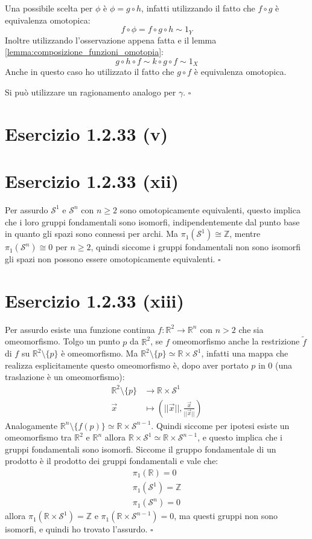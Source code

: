 \documentclass[10pt]{scrartcl}
\newcommand{\Z}{\mathbb{Z}}
\newcommand{\Sph}[1][]{\mathcal{S}^#1}
\begin{document}
Una possibile scelta per $ \phi $ è $ \phi = g \circ h $, infatti utilizzando
il fatto che $ f \circ g $ è equivalenza omotopica:
\[
  f \circ \phi = f \circ g \circ h \sim 1_Y
\]
Inoltre utilizzando l'osservazione appena fatta e il lemma
\ref{lemma:composizione_funzioni_omotopia}:
\[
  g \circ h \circ f \sim k \circ g \circ f \sim 1_X
\]
Anche in questo caso ho utilizzato il fatto che $ g \circ f $ è equivalenza
omotopica.

Si può utilizzare un ragionamento analogo per $ \gamma $.
\hfill $ \square $

\section*{Esercizio 1.2.33 (v)}


\section*{Esercizio 1.2.33 (xii)}
Per assurdo $ \Sph{1} $ e $ \Sph{n} $ con $ n \geq 2 $ sono omotopicamente
equivalenti, questo implica che i loro gruppi fondamentali sono isomorfi,
indipendentemente dal punto base in quanto gli spazi sono connessi per archi.
Ma $ \pi_1(\Sph{1}) \cong \Z $, mentre $ \pi_1(\Sph{n}) \cong 0 $ per $ n \geq 2 $, quindi
siccome i gruppi fondamentali non sono isomorfi gli spazi non possono
essere omotopicamente equivalenti.
\hfill $ \square $

\section*{Esercizio 1.2.33 (xiii)}
Per assurdo esiste una funzione continua $ f \colon \mathbb{R}^2 \to \mathbb{R}^n $
con $ n > 2 $ che sia omeomorfismo. Tolgo un punto $ p $ da $ \mathbb{R}^2 $,
se $ f $ omeomorfismo anche la restrizione $ \tilde{f} $ di $ f $ su
$ \mathbb{R}^2 \setminus \{ p \} $ è omeomorfismo.
Ma  $ \mathbb{R}^{2} \setminus  \{ p \} \simeq \mathbb{R} \times \mathcal{S}^1 $, infatti una mappa
che realizza esplicitamente questo omeomorfismo è, dopo aver portato $ p $ in $ 0 $
(una traslazione è un omeomorfismo):
\begin{align*}
  \mathbb{R}^{2} \setminus \{ p \} & \to \mathbb{R} \times \mathcal{S}^1 \\
  \vec{x} & \mapsto \left( || \vec{x} ||, \frac{\vec{x}}{|| \vec{x} ||} \right)
\end{align*}
Analogamente $ \mathbb{R}^{n} \setminus \{ f(p) \}  \simeq \mathbb{R} \times \Sph{n-1} $.
Quindi siccome per ipotesi esiste un omeomorfismo tra $ \mathbb{R}^{2} $ e
$ \mathbb{R}^{n} $ allora $ \mathbb{R} \times \Sph{1} \simeq \mathbb{R} \times \Sph{n-1} $,
e questo implica che i gruppi fondamentali sono isomorfi.
Siccome il gruppo fondamentale di un prodotto è il prodotto dei gruppi fondamentali
e vale che:
\begin{gather*}
  \pi_1(\mathbb{R}) = 0 \\
  \pi_1(\Sph{1}) = \Z \\
  \pi_1(\Sph{n}) = 0
\end{gather*}
allora $ \pi_1 (\mathbb{R} \times \Sph{1}) = \Z $ e $ \pi_1(\mathbb{R} \times \Sph{n-1}) = 0 $, ma
questi gruppi non sono isomorfi, e quindi ho trovato l'assurdo.
\hfill $ \square $
\end{document}
